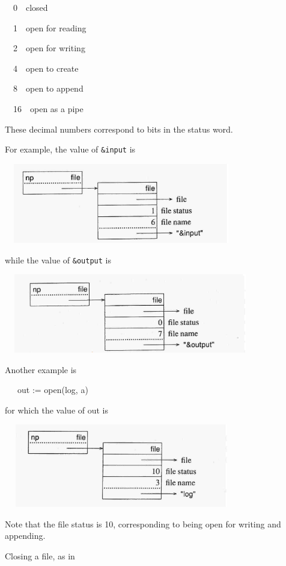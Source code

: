 \ \ 0\ \ closed

\ \ 1\ \ open for reading

\ \ 2\ \ open for writing

\ \ 4\ \ open to create

\ \ 8\ \ open to append

\ \ 16\ \ open as a pipe

\noindent These decimal numbers correspond to bits in the status word.

For example, the value of \texttt{\&input} is


\ \  \includegraphics[width=3.7402in,height=1.3661in]{ib-img/ib-img107.jpg} 

\noindent while the value of \texttt{\&output} is


\ \  \includegraphics[width=4.0602in,height=1.352in]{ib-img/ib-img108.jpg} 

Another example is

{\ttfamily\mdseries
\ \ \ out := open({\textquotedbl}log{\textquotedbl}, {\textquotedbl}a{\textquotedbl})}

\noindent for which the value of out is


\ \  \includegraphics[width=3.7402in,height=1.4252in]{ib-img/ib-img109.jpg} 

Note that the file status is 10, corresponding to being open for
writing and appending.

Closing a file, as in

